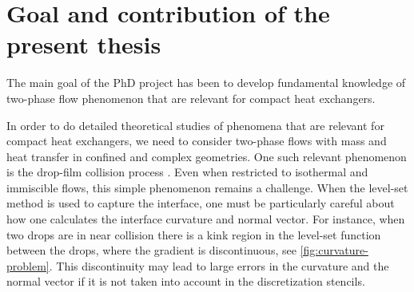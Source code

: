 \documentclass[11pt,b5paper,DIV=calc,BCOR1.3cm,headings=small,%
               footinclude=false,headsepline]{scrbook}
\begin{document}
\clearpage
\section{Goal and contribution of the present thesis}
The main goal of the PhD project has been to develop fundamental knowledge of
two-phase flow phenomenon that are relevant for compact heat exchangers.

In order to do detailed theoretical studies of phenomena that are relevant for
compact heat exchangers, we need to consider two-phase flows with mass and heat
transfer in confined and complex geometries.  One such relevant phenomenon is
the drop-film collision process \cite{Zhao09}.  Even when restricted to
isothermal and immiscible flows, this simple phenomenon remains a challenge.
When the level-set method is used to capture the interface, one must be
particularly careful about how one calculates the interface curvature and
normal vector.  For instance, when two drops are in near collision there is
a kink region in the level-set function between the drops, where the gradient
is discontinuous, see \cref{fig:curvature-problem}.  This discontinuity may
lead to large errors in the curvature and the normal vector if it is not taken
into account in the discretization stencils.
\end{document}
